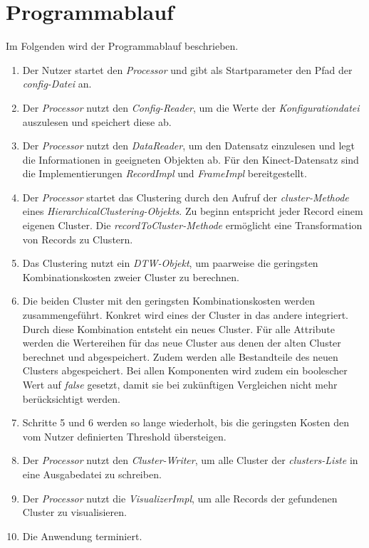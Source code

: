 \section{Programmablauf}
\label{4-Programmablauf}
Im Folgenden wird der Programmablauf beschrieben.
\begin{enumerate}
    \item Der Nutzer startet den \emph{Processor}
    und gibt als Startparameter den Pfad der \emph{config-Datei} an.
    \item Der \emph{Processor} nutzt den \emph{Config-Reader}, um die Werte der \emph{Konfigurationdatei} auszulesen
    und speichert diese ab.
    \item Der \emph{Processor} nutzt den \emph{DataReader}, um den Datensatz einzulesen
    und legt die Informationen in geeigneten Objekten ab.
    Für den Kinect-Datensatz sind die Implementierungen \emph{RecordImpl} und \emph{FrameImpl}
    bereitgestellt.
    \item Der \emph{Processor} startet das Clustering durch den Aufruf der \emph{cluster-Methode}
    eines \emph{HierarchicalClustering-Objekts}.
    Zu beginn entspricht jeder Record einem eigenen Cluster.
    Die \emph{recordToCluster-Methode} ermöglicht eine Transformation von Records zu Clustern.
    \item Das Clustering nutzt ein \emph{\ac{DTW}-Objekt},
    um paarweise die geringsten Kombinationskosten zweier Cluster zu berechnen.
    \item Die beiden Cluster mit den geringsten Kombinationskosten werden zusammengeführt.
    Konkret wird eines der Cluster in das andere integriert.
    Durch diese Kombination entsteht ein neues Cluster.
    Für alle Attribute werden die Wertereihen für das neue Cluster aus denen der alten Cluster berechnet und abgespeichert.
    Zudem werden alle Bestandteile des neuen Clusters abgespeichert.
    Bei allen Komponenten wird zudem ein boolescher Wert auf \emph{false} gesetzt,
    damit sie bei zukünftigen Vergleichen nicht mehr berücksichtigt werden.
    \item Schritte 5 und 6 werden so lange wiederholt, bis die geringsten Kosten den vom Nutzer definierten Threshold übersteigen.
    \item Der \emph{Processor} nutzt den \emph{Cluster-Writer}, um alle Cluster der \emph{clusters-Liste}
    in eine Ausgabedatei zu schreiben.
    \item Der \emph{Processor} nutzt die \emph{VisualizerImpl}, um alle Records der gefundenen Cluster zu visualisieren.
    \item Die Anwendung terminiert. 
\end{enumerate}

